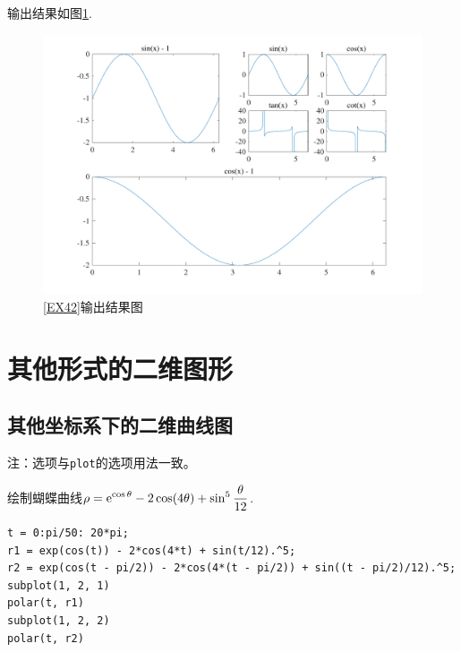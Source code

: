 输出结果如图\ref{OEX42}.
\begin{figure}[!htb]
	\centering
	\includegraphics[width=0.8\linewidth]{pic/绘图2.pdf}
	\vspace*{-1.5em}
	\caption{\ref{EX42}输出结果图}
	\label{OEX42}
\end{figure}

\section{其他形式的二维图形}
\subsection{其他坐标系下的二维曲线图}
\begin{table}[!htb]
	\centering
\end{table}

注：选项与\lstinline|plot|的选项用法一致。

\examples \label{EX43}绘制蝴蝶曲线$\displaystyle \rho = {\rm{e}}^{\cos \theta}- 2\cos(4\theta)+\sin^5\dfrac{\theta}{12}$.
\vspace*{1em}
\begin{lstlisting}
t = 0:pi/50: 20*pi;
r1 = exp(cos(t)) - 2*cos(4*t) + sin(t/12).^5;
r2 = exp(cos(t - pi/2)) - 2*cos(4*(t - pi/2)) + sin((t - pi/2)/12).^5;
subplot(1, 2, 1)
polar(t, r1)
subplot(1, 2, 2)
polar(t, r2)
\end{lstlisting}

